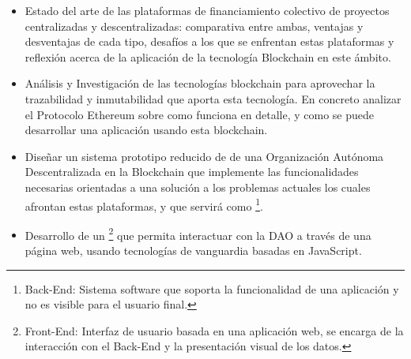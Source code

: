 \begin{itemize}

    \item Estado del arte de las plataformas de financiamiento colectivo de proyectos centralizadas y descentralizadas: comparativa entre ambas, ventajas y desventajas de cada tipo, desafíos a los que se enfrentan estas plataformas y reflexión acerca de la aplicación de la tecnología Blockchain en este ámbito.

    \item Análisis y Investigación de las tecnologías blockchain para aprovechar la trazabilidad y inmutabilidad que aporta esta tecnología. En concreto analizar el Protocolo Ethereum sobre como funciona en detalle, y como se puede desarrollar una aplicación usando esta blockchain.

    \item Diseñar un sistema prototipo reducido de de una Organización Autónoma Descentralizada en la Blockchain que implemente las funcionalidades necesarias orientadas a una solución a los problemas actuales los cuales afrontan estas plataformas, y que servirá como \footnote{Back-End: Sistema software que soporta la funcionalidad de una aplicación y no es visible para el usuario final.}.


    \item Desarrollo de un \footnote{Front-End: Interfaz de usuario basada en una aplicación web, se encarga de la interacción con el Back-End y la presentación visual de los datos.} que permita interactuar con la DAO a través de una página web, usando tecnologías de vanguardia basadas en JavaScript.



\end{itemize}